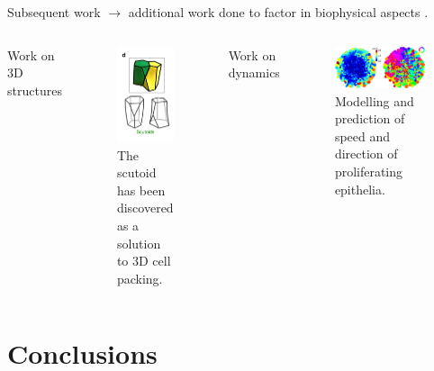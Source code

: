 \documentclass[aspectratio=169, 10pt]{beamer}
\begin{document}
\begin{frame}[fragile]{Subsequent work}
$\rightarrow$ additional work done to factor in biophysical aspects \cite{farhadifar2007influence}.
 \begin{columns}[T,onlytextwidth]
    Work on 3D structures
    \begin{figure}
      \centering
      \includegraphics[width=.3\textwidth]{figures/scutoids.png}
      \caption{The scutoid has been discovered as a solution to 3D cell packing.\cite{gomez2018scutoids}}
    \end{figure}
    Work on dynamics
    \begin{figure}
      \centering
      \includegraphics[width=\textwidth]{figures/Cell_Dynamics.jpg}
      \caption{Modelling and prediction of speed and direction of proliferating epithelia. \cite{aland2015mechanistic}}
      \label{}
    \end{figure}
  \end{columns}
\end{frame}

\section{Conclusions}
\end{document}
